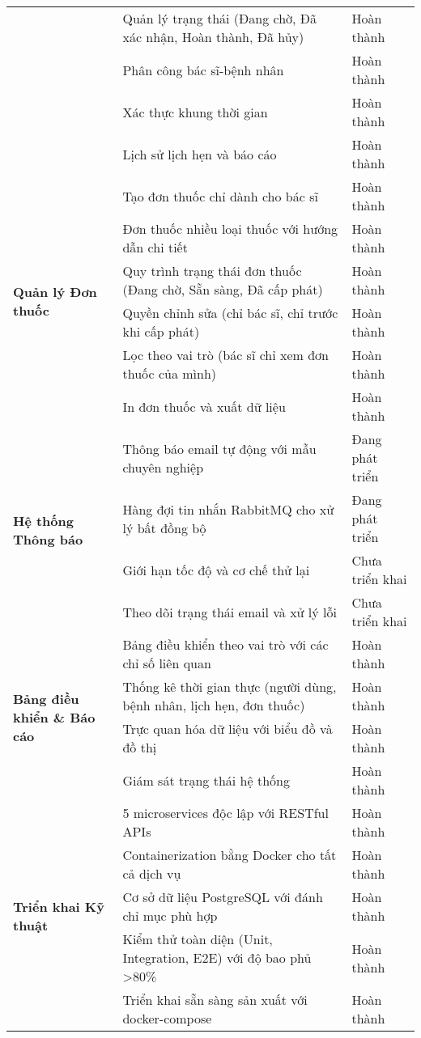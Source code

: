 \documentclass[12pt,a4paper]{report}
\begin{document}
\begin{table}[H]
\begin{tabular}{|p{4cm}|p{8cm}|p{2.5cm}|}
    \cline{2-3}
    & Quản lý trạng thái (Đang chờ, Đã xác nhận, Hoàn thành, Đã hủy) & Hoàn thành \\
    \cline{2-3}
    & Phân công bác sĩ-bệnh nhân & Hoàn thành \\
    \cline{2-3}
    & Xác thực khung thời gian & Hoàn thành \\
    \cline{2-3}
    & Lịch sử lịch hẹn và báo cáo & Hoàn thành \\
    \hline
    \multirow{6}{4cm}{\textbf{Quản lý Đơn thuốc}} & Tạo đơn thuốc chỉ dành cho bác sĩ & Hoàn thành \\
    \cline{2-3}
    & Đơn thuốc nhiều loại thuốc với hướng dẫn chi tiết & Hoàn thành \\
    \cline{2-3}
    & Quy trình trạng thái đơn thuốc (Đang chờ, Sẵn sàng, Đã cấp phát) & Hoàn thành \\
    \cline{2-3}
    & Quyền chỉnh sửa (chỉ bác sĩ, chỉ trước khi cấp phát) & Hoàn thành \\
    \cline{2-3}
    & Lọc theo vai trò (bác sĩ chỉ xem đơn thuốc của mình) & Hoàn thành \\
    \cline{2-3}
    & In đơn thuốc và xuất dữ liệu & Hoàn thành \\
    \hline
    \multirow{4}{4cm}{\textbf{Hệ thống Thông báo}} & Thông báo email tự động với mẫu chuyên nghiệp & Đang phát triển \\
    \cline{2-3}
    & Hàng đợi tin nhắn RabbitMQ cho xử lý bất đồng bộ & Đang phát triển \\
    \cline{2-3}
    & Giới hạn tốc độ và cơ chế thử lại & Chưa triển khai \\
    \cline{2-3}
    & Theo dõi trạng thái email và xử lý lỗi & Chưa triển khai \\
    \hline
    \multirow{4}{4cm}{\textbf{Bảng điều khiển \& Báo cáo}} & Bảng điều khiển theo vai trò với các chỉ số liên quan & Hoàn thành \\
    \cline{2-3}
    & Thống kê thời gian thực (người dùng, bệnh nhân, lịch hẹn, đơn thuốc) & Hoàn thành \\
    \cline{2-3}
    & Trực quan hóa dữ liệu với biểu đồ và đồ thị & Hoàn thành \\
    \cline{2-3}
    & Giám sát trạng thái hệ thống & Hoàn thành \\
    \hline
    \multirow{5}{4cm}{\textbf{Triển khai Kỹ thuật}} & 5 microservices độc lập với RESTful APIs & Hoàn thành \\
    \cline{2-3}
    & Containerization bằng Docker cho tất cả dịch vụ & Hoàn thành \\
    \cline{2-3}
    & Cơ sở dữ liệu PostgreSQL với đánh chỉ mục phù hợp & Hoàn thành \\
    \cline{2-3}
    & Kiểm thử toàn diện (Unit, Integration, E2E) với độ bao phủ >80\% & Hoàn thành \\
    \cline{2-3}
    & Triển khai sẵn sàng sản xuất với docker-compose & Hoàn thành \\
    \hline
    \end{tabular}
    \end{table}
\end{document}
